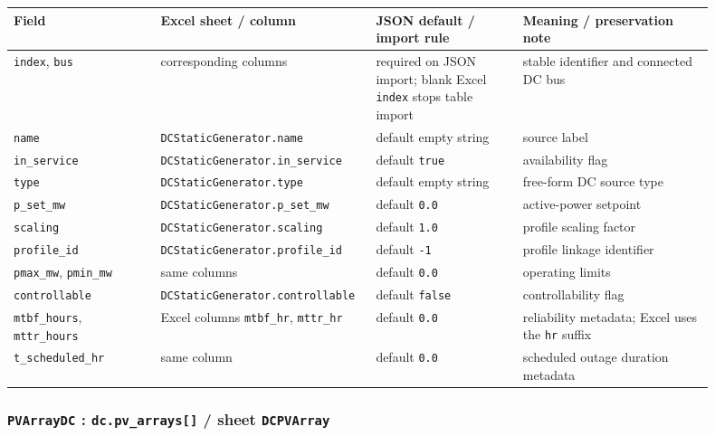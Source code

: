 \begin{longtable}{L{0.20\linewidth}L{0.24\linewidth}L{0.20\linewidth}L{0.26\linewidth}}
\toprule
Field & Excel sheet / column & JSON default / import rule & Meaning / preservation note \\
\midrule
\endhead
\texttt{index}, \texttt{bus} & corresponding columns & required on JSON import; blank Excel \texttt{index} stops table import & stable identifier and connected DC bus \\
\texttt{name} & \texttt{DCStaticGenerator.name} & default empty string & source label \\
\texttt{in\_service} & \texttt{DCStaticGenerator.in\_service} & default \texttt{true} & availability flag \\
\texttt{type} & \texttt{DCStaticGenerator.type} & default empty string & free-form DC source type \\
\texttt{p\_set\_mw} & \texttt{DCStaticGenerator.p\_set\_mw} & default \texttt{0.0} & active-power setpoint \\
\texttt{scaling} & \texttt{DCStaticGenerator.scaling} & default \texttt{1.0} & profile scaling factor \\
\texttt{profile\_id} & \texttt{DCStaticGenerator.profile\_id} & default \texttt{-1} & profile linkage identifier \\
\texttt{pmax\_mw}, \texttt{pmin\_mw} & same columns & default \texttt{0.0} & operating limits \\
\texttt{controllable} & \texttt{DCStaticGenerator.controllable} & default \texttt{false} & controllability flag \\
\texttt{mtbf\_hours}, \texttt{mttr\_hours} & Excel columns \texttt{mtbf\_hr}, \texttt{mttr\_hr} & default \texttt{0.0} & reliability metadata; Excel uses the \texttt{hr} suffix \\
\texttt{t\_scheduled\_hr} & same column & default \texttt{0.0} & scheduled outage duration metadata \\
\bottomrule
\end{longtable}

\subsubsection*{\texttt{PVArrayDC} : \texttt{dc.pv\_arrays[]} / sheet \texttt{DCPVArray}}

